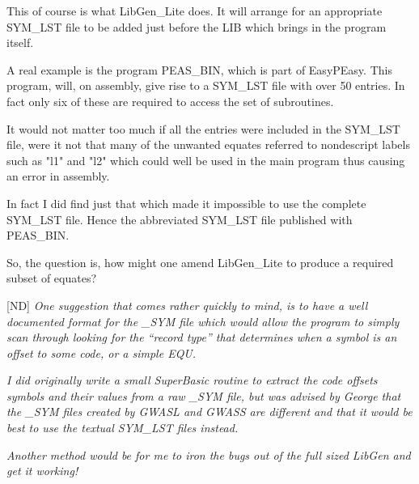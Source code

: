This of course is what LibGen\_Lite does. It will arrange for an appropriate SYM\_LST file to be added just before the LIB which brings in the program itself.

A real example is the program PEAS\_BIN, which is part of EasyPEasy. This program, will, on assembly, give rise to a SYM\_LST file with over 50 entries. In fact only six of these are required to access the set of subroutines.

It would not matter too much if all the entries were included in the SYM\_LST file, were it not that many of the unwanted equates referred to nondescript labels such as "l1" and "l2" which could well be used in the main program thus causing an error in assembly.

In fact I did find just that which made it impossible to use the complete SYM\_LST file. Hence the abbreviated SYM\_LST file published with PEAS\_BIN.

So, the question is, how might one amend LibGen\_Lite to produce a required subset of equates?

[ND] \emph{One suggestion that comes rather quickly to mind, is to have a well documented format for the \_SYM file which would allow the program to simply scan through looking for the ``record type'' that determines when a symbol is an offset to some code, or a simple EQU.}

\emph{I did originally write a small SuperBasic routine to extract the code offsets symbols and their values from a raw \_SYM file, but was advised by George that the \_SYM files created by GWASL and GWASS are different and that it would be best to use the textual SYM\_LST files instead.}

\emph{Another method would be for me to iron the bugs out of the full sized LibGen and get it working!}
